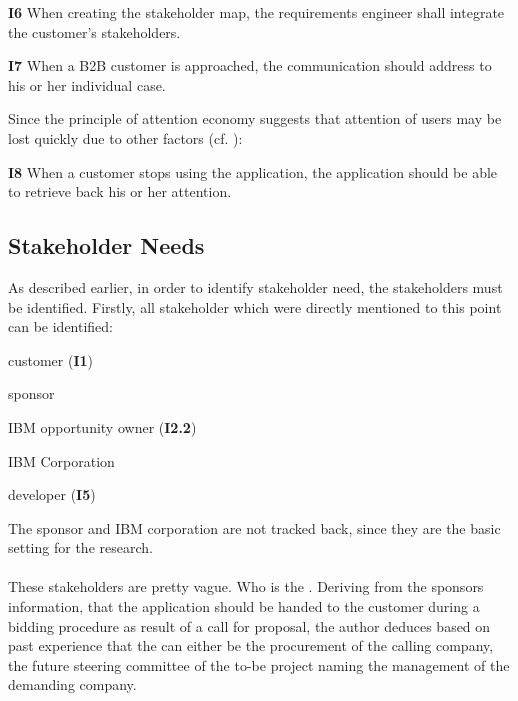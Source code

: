 \begin{closeItem}
    \item [\textbf{I6}] When creating the stakeholder map, the requirements engineer shall integrate the customer's stakeholders.
    \item [\textbf{I7}] When a B2B customer is approached, the communication should address to his or her individual case.
\end{closeItem}

Since the principle of attention economy suggests that attention of users may be lost quickly due to other factors (cf. \Cref{}):

\begin{closeItem}
    \item [\textbf{I8}] When a customer stops using the application, the application should be able to retrieve back his or her attention.
\end{closeItem}

\paragraph{}

\subsection{Stakeholder Needs}
As described earlier, in order to identify stakeholder need, the stakeholders must be identified. Firstly, all stakeholder which were directly mentioned to this point can be identified:

\begin{closeItemCol}
    \item customer (\textbf{I1})
    \item sponsor
    \item IBM opportunity owner (\textbf{I2.2})
    \item IBM Corporation
    \item developer (\textbf{I5})
\end{closeItemCol}

The sponsor and IBM corporation are not tracked back, since they are the basic setting for the research.

\paragraph{} These stakeholders are pretty vague. Who is the . Deriving from the sponsors information, that the application should be handed to the customer during a bidding procedure as result of a call for proposal, the author deduces based on past experience that the  can either be the procurement of the calling company, the future steering committee of the to-be project naming the management of the demanding company. 

